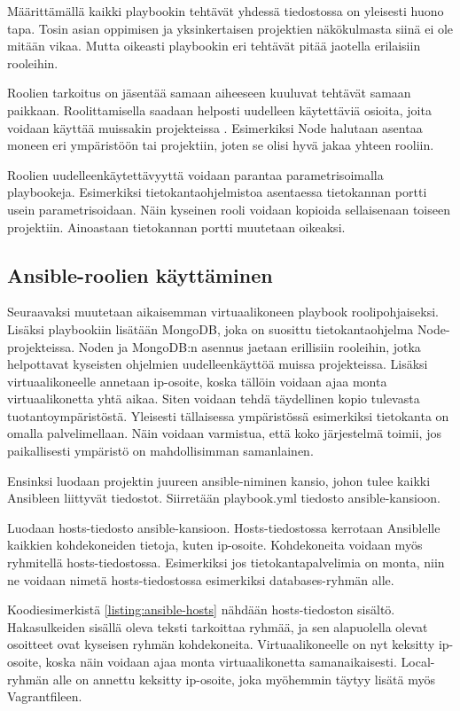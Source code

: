 Määrittämällä kaikki playbookin tehtävät yhdessä tiedostossa on yleisesti huono tapa. Tosin asian oppimisen ja yksinkertaisen projektien näkökulmasta siinä ei ole mitään vikaa. Mutta oikeasti playbookin eri tehtävät pitää jaotella erilaisiin rooleihin.

Roolien tarkoitus on jäsentää samaan aiheeseen kuuluvat tehtävät samaan paikkaan. Roolittamisella saadaan helposti uudelleen käytettäviä osioita, joita voidaan käyttää muissakin projekteissa \cite{link:ansible-roles-and-includes}. Esimerkiksi Node halutaan asentaa moneen eri ympäristöön tai projektiin, joten se olisi hyvä jakaa yhteen rooliin.

Roolien uudelleenkäytettävyyttä voidaan parantaa parametrisoimalla playbookeja. Esimerkiksi tietokantaohjelmistoa asentaessa tietokannan portti usein parametrisoidaan. Näin kyseinen rooli voidaan kopioida sellaisenaan toiseen projektiin. Ainoastaan tietokannan portti muutetaan oikeaksi.

\subsection{Ansible-roolien käyttäminen}

Seuraavaksi muutetaan aikaisemman virtuaalikoneen playbook roolipohjaiseksi. Lisäksi playbookiin lisätään MongoDB, joka on suosittu tietokantaohjelma Node-projekteissa. Noden ja MongoDB:n asennus jaetaan erillisiin rooleihin, jotka helpottavat kyseisten ohjelmien uudelleenkäyttöä muissa projekteissa. Lisäksi virtuaalikoneelle annetaan ip-osoite, koska tällöin voidaan ajaa monta virtuaalikonetta yhtä aikaa. Siten voidaan tehdä täydellinen kopio tulevasta tuotantoympäristöstä. Yleisesti tällaisessa ympäristössä esimerkiksi tietokanta on omalla palvelimellaan. Näin voidaan varmistua, että koko järjestelmä toimii, jos paikallisesti ympäristö on mahdollisimman samanlainen.

Ensinksi luodaan projektin juureen ansible-niminen kansio, johon tulee kaikki Ansibleen liittyvät tiedostot. Siirretään playbook.yml tiedosto ansible-kansioon.

Luodaan hosts-tiedosto ansible-kansioon. Hosts-tiedostossa kerrotaan Ansiblelle kaikkien kohdekoneiden tietoja, kuten ip-osoite. Kohdekoneita voidaan myös ryhmitellä hosts-tiedostossa. Esimerkiksi jos tietokantapalvelimia on monta, niin ne voidaan nimetä hosts-tiedostossa esimerkiksi databases-ryhmän alle.

Koodiesimerkistä \ref{listing:ansible-hosts} nähdään hosts-tiedoston sisältö. Hakasulkeiden sisällä oleva teksti tarkoittaa ryhmää, ja sen alapuolella olevat osoitteet ovat kyseisen ryhmän kohdekoneita. Virtuaalikoneelle on nyt keksitty ip-osoite, koska näin voidaan ajaa monta virtuaalikonetta samanaikaisesti. Local-ryhmän alle on annettu keksitty ip-osoite, joka myöhemmin täytyy lisätä myös Vagrantfileen.

